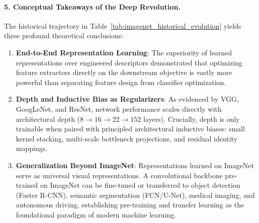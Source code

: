 \paragraph{5. Conceptual Takeaways of the Deep Revolution.}
The historical trajectory in Table~\ref{tab:imagenet_historical_evolution} yields three profound theoretical conclusions:
\begin{enumerate}[leftmargin=*]
  \item \textbf{End-to-End Representation Learning}: The superiority of learned representations over engineered descriptors demonstrated that optimizing feature extractors directly on the downstream objective is vastly more powerful than separating feature design from classifier optimization.
  \item \textbf{Depth and Inductive Bias as Regularizers}: As evidenced by VGG, GoogLeNet, and ResNet, network performance scales directly with architectural depth ($8 \to 16 \to 22 \to 152$ layers). Crucially, depth is only trainable when paired with principled architectural inductive biases: small kernel stacking, multi-scale bottleneck projections, and residual identity mappings.
  \item \textbf{Generalization Beyond ImageNet}: Representations learned on ImageNet serve as universal visual representations. A convolutional backbone pre-trained on ImageNet can be fine-tuned or transferred to object detection (Faster R-CNN), semantic segmentation (FCN/U-Net), medical imaging, and autonomous driving, establishing pre-training and transfer learning as the foundational paradigm of modern machine learning.
\end{enumerate}
